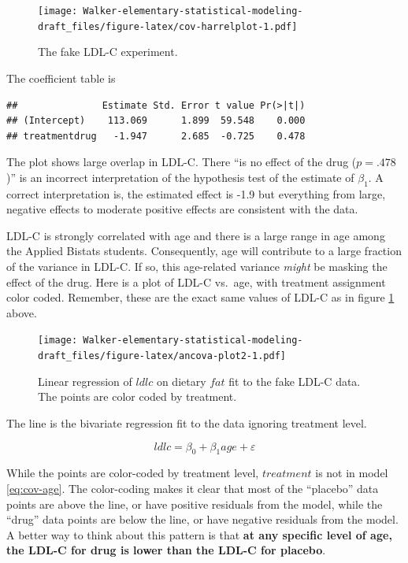 \documentclass[]{book}
\begin{document}
\begin{figure}
\centering
\texttt{[image: Walker-elementary-statistical-modeling-draft\_files/figure-latex/cov-harrelplot-1.pdf]}
\caption{\label{fig:cov-harrelplot}The fake LDL-C experiment.}
\end{figure}

The coefficient table is

\begin{verbatim}
##               Estimate Std. Error t value Pr(>|t|)
## (Intercept)    113.069      1.899  59.548    0.000
## treatmentdrug   -1.947      2.685  -0.725    0.478
\end{verbatim}

The plot shows large overlap in LDL-C. There ``is no effect of the drug
(\(p = .478\))'' is an incorrect interpretation of the hypothesis test
of the estimate of \(\beta_1\). A correct interpretation is, the
estimated effect is -1.9 but everything from large, negative effects to
moderate positive effects are consistent with the data.

LDL-C is strongly correlated with age and there is a large range in age
among the Applied Bistats students. Consequently, age will contribute to
a large fraction of the variance in LDL-C. If so, this age-related
variance \emph{might} be masking the effect of the drug. Here is a plot
of LDL-C vs.~age, with treatment assignment color coded. Remember, these
are the exact same values of LDL-C as in figure \ref{fig:cov-harrelplot}
above.

\begin{figure}
\centering
\texttt{[image: Walker-elementary-statistical-modeling-draft\_files/figure-latex/ancova-plot2-1.pdf]}
\caption{\label{fig:ancova-plot2}Linear regression of \(ldlc\) on dietary
\(fat\) fit to the fake LDL-C data. The points are color coded by
treatment.}
\end{figure}

The line is the bivariate regression fit to the data ignoring treatment
level.

\begin{equation}
ldlc = \beta_0 + \beta_1 age + \varepsilon
\label{eq:cov-age}
\end{equation}

While the points are color-coded by treatment level, \(treatment\) is
not in model \eqref{eq:cov-age}. The color-coding makes it clear that most
of the ``placebo'' data points are above the line, or have positive
residuals from the model, while the ``drug'' data points are below the
line, or have negative residuals from the model. A better way to think
about this pattern is that \textbf{at any specific level of age, the
LDL-C for drug is lower than the LDL-C for placebo}.
\end{document}
